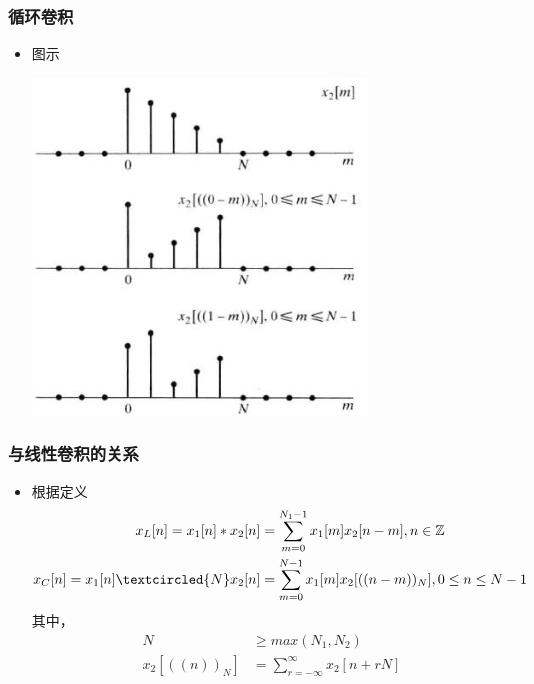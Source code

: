 \documentclass[CJKutf8,dvipsnames,table]{beamer}
\begin{document}
\begin{CJK*}{UTF8}{song}
\begin{frame}
\begin{itemize}
	\end{itemize}
  \end{frame}  
        
  \begin{frame}
    \frametitle{循环卷积}
    \begin{itemize}
    \item 图示
   		\begin{center}
   		\includegraphics[scale=.6]{dtsp-c-f8-14acd}
   		\end{center}    
	\end{itemize}
  \end{frame} 

  \begin{frame}
    \frametitle{与线性卷积的关系}
    \begin{itemize}
    \item 根据定义
    \begin{align*}
	    x_L[n] = x_1[n] \ast x_2[n] & = \sum_{m=0}^{N_1-1}x_1[m]x_2[n-m], n \in \mathbb{Z}    \\ 	
	    x_C[n] = x_1[n] \textcircled{N} x_2[n] & = \sum_{m=0}^{N-1}x_1[m]x_2[((n-m))_N], 0 \leq n \leq N-1 	    
    \end{align*}
    其中，
    \begin{align*}
	    N & \geq max(N_1, N_2) \\
	    x_2[((n))_N] & = \sum_{r=-\infty}^{\infty} x_2[n+rN]
	\end{align*}
	\end{itemize}
  \end{frame} 
  

\end{CJK*}
\end{document}
